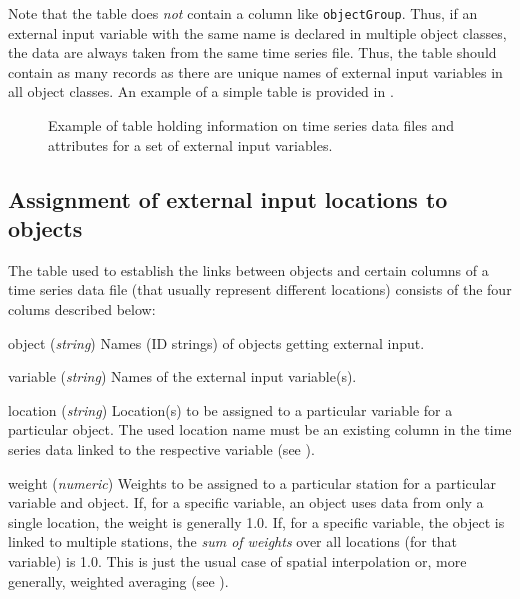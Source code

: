 Note that the table does \emph{not} contain a column like \verb!objectGroup!. Thus, if an external input variable with the same name is declared in multiple object classes, the data are always taken from the same time series file. Thus, the table should contain as many records as there are unique names of external input variables in all object classes. An example of a simple table is provided in .

\begin{figure*}[htbp]
  
  \caption{Example of table holding information on time series data files and attributes for a set of external input variables. \label{fig:input-externalVariables}}
\end{figure*}

\subsection{Assignment of external input locations to objects} \label{sec:input-externalLocations}

The table used to establish the links between objects and certain columns of a time series data file (that usually represent different locations) consists of the four colums described below:

\begin{columndef}
  \item [object] (\textit{string}) Names (ID strings) of objects getting external input.
  \item [variable] (\textit{string}) Names of the external input variable(s).
  \item [location] (\textit{string}) Location(s) to be assigned to a particular variable for a particular object. The used location name must be an existing column in the time series data linked to the respective variable (see ).
  \item [weight] (\textit{numeric}) Weights to be assigned to a particular station for a particular variable and object. If, for a specific variable, an object uses data from only a single location, the weight is generally 1.0. If, for a specific variable, the object is linked to multiple stations, the \emph{sum of weights} over all locations (for that variable) is 1.0. This is just the usual case of spatial interpolation or, more generally, weighted averaging (see ).
\end{columndef}

